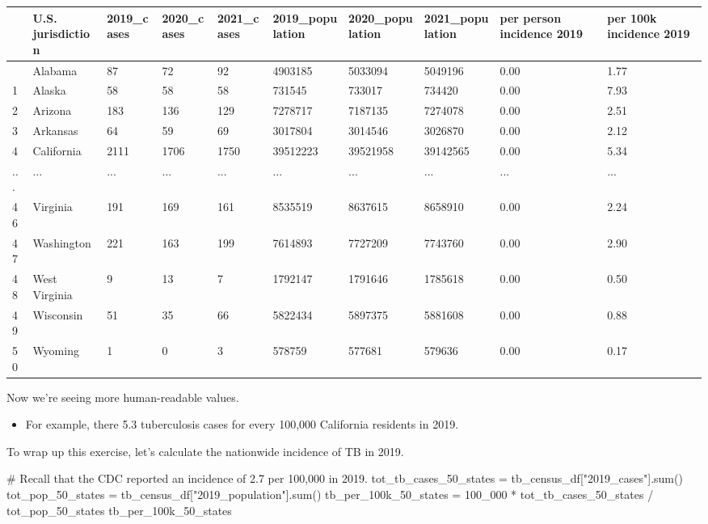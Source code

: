 \documentclass[
  letterpaper,
  DIV=11,
  numbers=noendperiod]{scrreprt}
\newenvironment{Shaded}{\begin{snugshade}}{\end{snugshade}}
\newcommand{\BuiltInTok}[1]{\textcolor[rgb]{0.00,0.23,0.31}{#1}}
\newcommand{\CommentTok}[1]{\textcolor[rgb]{0.37,0.37,0.37}{#1}}
\newcommand{\DecValTok}[1]{\textcolor[rgb]{0.68,0.00,0.00}{#1}}
\newcommand{\NormalTok}[1]{\textcolor[rgb]{0.00,0.23,0.31}{#1}}
\newcommand{\OperatorTok}[1]{\textcolor[rgb]{0.37,0.37,0.37}{#1}}
\newcommand{\StringTok}[1]{\textcolor[rgb]{0.13,0.47,0.30}{#1}}
\providecommand{\tightlist}{%
  \setlength{\itemsep}{0pt}\setlength{\parskip}{0pt}}\usepackage{longtable,booktabs,array}
\begin{document}
\begin{longtable}[]{@{}llllllllll@{}}
\toprule\noalign{}
& U.S. jurisdiction & 2019\_cases & 2020\_cases & 2021\_cases &
2019\_population & 2020\_population & 2021\_population & per person
incidence 2019 & per 100k incidence 2019 \\
\midrule\noalign{}
\endhead
\bottomrule\noalign{}
\endlastfoot
0 & Alabama & 87 & 72 & 92 & 4903185 & 5033094 & 5049196 & 0.00 &
1.77 \\
1 & Alaska & 58 & 58 & 58 & 731545 & 733017 & 734420 & 0.00 & 7.93 \\
2 & Arizona & 183 & 136 & 129 & 7278717 & 7187135 & 7274078 & 0.00 &
2.51 \\
3 & Arkansas & 64 & 59 & 69 & 3017804 & 3014546 & 3026870 & 0.00 &
2.12 \\
4 & California & 2111 & 1706 & 1750 & 39512223 & 39521958 & 39142565 &
0.00 & 5.34 \\
... & ... & ... & ... & ... & ... & ... & ... & ... & ... \\
46 & Virginia & 191 & 169 & 161 & 8535519 & 8637615 & 8658910 & 0.00 &
2.24 \\
47 & Washington & 221 & 163 & 199 & 7614893 & 7727209 & 7743760 & 0.00 &
2.90 \\
48 & West Virginia & 9 & 13 & 7 & 1792147 & 1791646 & 1785618 & 0.00 &
0.50 \\
49 & Wisconsin & 51 & 35 & 66 & 5822434 & 5897375 & 5881608 & 0.00 &
0.88 \\
50 & Wyoming & 1 & 0 & 3 & 578759 & 577681 & 579636 & 0.00 & 0.17 \\
\end{longtable}

Now we're seeing more human-readable values.

\begin{itemize}
\tightlist
\item
  For example, there 5.3 tuberculosis cases for every 100,000 California
  residents in 2019.
\end{itemize}

To wrap up this exercise, let's calculate the nationwide incidence of TB
in 2019.

\begin{Shaded}
\begin{Highlighting}[]
\CommentTok{\# Recall that the CDC reported an incidence of 2.7 per 100,000 in 2019.}
\NormalTok{tot\_tb\_cases\_50\_states }\OperatorTok{=}\NormalTok{ tb\_census\_df[}\StringTok{"2019\_cases"}\NormalTok{].}\BuiltInTok{sum}\NormalTok{()}
\NormalTok{tot\_pop\_50\_states }\OperatorTok{=}\NormalTok{ tb\_census\_df[}\StringTok{"2019\_population"}\NormalTok{].}\BuiltInTok{sum}\NormalTok{()}
\NormalTok{tb\_per\_100k\_50\_states }\OperatorTok{=} \DecValTok{100\_000} \OperatorTok{*}\NormalTok{ tot\_tb\_cases\_50\_states }\OperatorTok{/}\NormalTok{ tot\_pop\_50\_states}
\NormalTok{tb\_per\_100k\_50\_states}
\end{Highlighting}
\end{Shaded}
\end{document}
